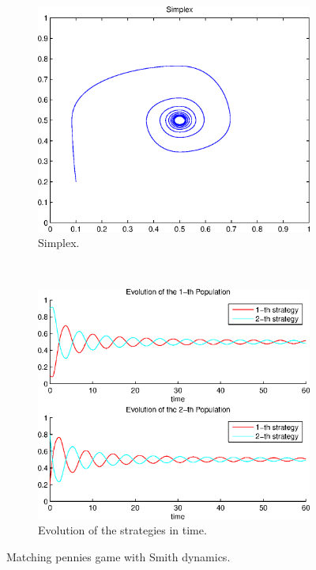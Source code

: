 \documentclass[a4paper,10pt]{article}
\begin{document}
\begin{figure}[h]
  \centering
  \begin{subfigure}[b]{0.45\textwidth}
	  \includegraphics[width=\textwidth]{./images/test2_simplex_smith.eps}
	  \caption{Simplex.}
	  \label{fig:test2_simplex_smith}
  \end{subfigure}
  ~ 
  \begin{subfigure}[b]{0.45\textwidth}
	  \includegraphics[width=\textwidth]{./images/test2_ev_smith.eps}
	  \caption{Evolution of the strategies in time.}
	  \label{fig:test2_ev_smith}
  \end{subfigure}
  \caption{Matching pennies game with Smith dynamics.}
  \label{fig:mp_game_smith}
\end{figure}
\end{document}
